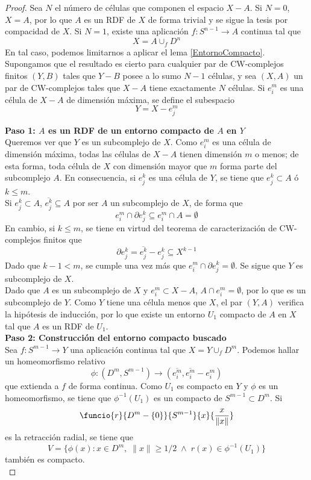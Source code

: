 \begin{proof}
Sea $N$ el número de células que componen el espacio $X-A$. Si $N=0$, $X=A$, por lo que $A$ es un RDF de $X$ de forma trivial y se sigue la tesis por compacidad de $X$. Si $N=1$, existe una aplicación $f: S^{n-1} \longrightarrow A$ continua tal que $$X=A\cup_f D^n$$ En tal caso, podemos limitarnos a aplicar el lema \ref{EntornoCompacto}.
\\

Supongamos que el resultado es cierto para cualquier par de CW-complejos finitos $(Y,B)$ tales que $Y-B$ posee a lo sumo $N-1$ células, y sea $(X,A)$ un par de CW-complejos tales que $X-A$ tiene exactamente $N$ células. Si $e^m_i$ es una célula de $X-A$ de dimensión máxima, se define el subespacio $$Y=X-e^m_j$$

\noindent\textbf{Paso 1: $A$ es un RDF de un entorno compacto de $A$ en $Y$}
\\
Queremos ver que $Y$ es un subcomplejo de $X$. Como $e^m_i$ es una célula de dimensión máxima, todas las células de $X-A$ tienen dimensión $m$ o menos; de esta forma, toda célula de $X$ con dimensión mayor que $m$ forma parte del subcomplejo $A$. En consecuencia, si $e^k_j$ es una célula de $Y$, se tiene que $e^k_j \subset A$ ó $k \leq m$.
\\

Si $e^k_j \subset A$, $\overline{e^k_j} \subseteq A$ por ser $A$ un subcomplejo de $X$, de forma que $$e^m_i \cap \partial e^k_j \subseteq e^m_i \cap A=\emptyset$$ En cambio, si $k \leq m$, se tiene en virtud del teorema de caracterización de CW-complejos finitos que $$\partial e^k_j=\overline{e^k_j}-e^k_j\subseteq X^{k-1}$$ Dado que $k-1 < m$, se cumple una vez más que $e^m_i \cap \partial e^k_j =\emptyset$.  Se sigue que $Y$ es subcomplejo de $X$.
\\

Dado que $A$ es un subcomplejo de $X$ y $e^m_i \subset X-A$, $A\cap e^m_i=\emptyset$, por lo que es un subcomplejo de $Y$. Como $Y$ tiene una célula menos que $X$, el par $(Y,A)$ verifica la hipótesis de inducción, por lo que existe un entorno $U_1$ compacto de $A$ en $X$ tal que $A$ es un RDF de $U_1$.
\\

\noindent\textbf{Paso 2: Construcción del entorno compacto buscado}
\\
Sea $f: S^{m-1} \longrightarrow Y$ una aplicación continua tal que $X=Y\cup_f D^m$. Podemos hallar un homeomorfismo relativo $$\phi: (D^m,S^{m-1}) \longrightarrow (\overline{e^m_i}, \overline{e^m_i}-e^m_i)$$ que extienda a $f$ de forma continua. Como $U_1$ es compacto en $Y$ y $\phi$ es un homeomorfismo, se tiene que $\phi^{-1}(U_1)$ es un compacto de $S^{m-1} \subset D^m$. Si $$\funcio{r}{D^m-\{0\}}{S^{m-1}}{x}{\frac{x}{\|x\|}}$$ es la retracción radial, se tiene que $$V=\{\phi(x): x \in D^m,\; \|x\| \geq 1/2\; \land\; r(x) \in \phi^{-1}(U_1)\}$$ también es compacto.
\\


\end{proof}
